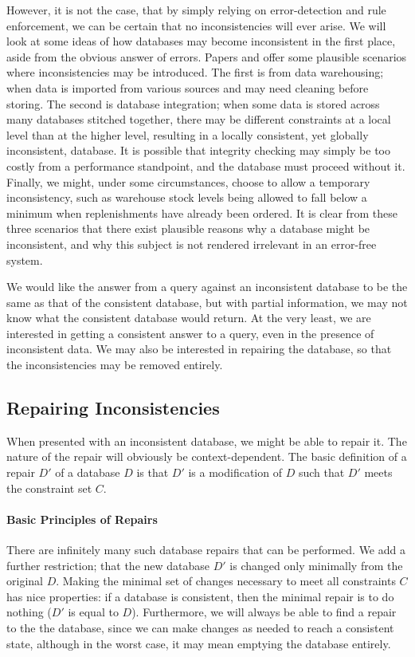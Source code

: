 \documentclass[a4paper]{report}
\begin{document}
However, it is not the case, that by simply relying on error-detection and rule enforcement, we can be certain that no inconsistencies will ever arise. We will look at some ideas of how databases may become inconsistent in the first place, aside from the obvious answer of errors. Papers \cite{CQI} and \cite{CQ} offer some plausible scenarios where inconsistencies may be introduced. The first is from data warehousing; when data is imported from various sources and may need cleaning before storing. The second is database integration; when some data is stored across many databases stitched together, there may be different constraints at a local level than at the higher level, resulting in a locally consistent, yet globally inconsistent, database. It is possible that integrity checking may simply be too costly from a performance standpoint, and the database must proceed without it. Finally, we might, under some circumstances, choose to allow a temporary inconsistency, such as warehouse stock levels being allowed to fall below a minimum when replenishments have already been ordered. It is clear from these three scenarios that there exist plausible reasons why a database might be inconsistent, and why this subject is not rendered irrelevant in an error-free system.

We would like the answer from a query against an inconsistent database to be the same as that of the consistent database, but with partial information, we may not know what the consistent database would return. At the very least, we are interested in getting a consistent answer to a query, even in the presence of inconsistent data. We may also be interested in repairing the database, so that the inconsistencies may be removed entirely.

\subsection*{Repairing Inconsistencies}
When presented with an inconsistent database, we might be able to repair it. The nature of the repair will obviously be context-dependent. The basic definition of a repair $D'$ of a database $D$ is that $D'$ is a modification of $D$ such that $D'$ meets the constraint set $C$.

\paragraph{Basic Principles of Repairs}
There are infinitely many such database repairs that can be performed. We add a further restriction; that the new database $D'$ is changed only minimally from the original $D$. Making the minimal set of changes necessary to meet all constraints $C$ has nice properties: if a database is consistent, then the minimal repair is to do nothing ($D'$ is equal to $D$). Furthermore, we will always be able to find a repair to the the database, since we can make changes as needed to reach a consistent state, although in the worst case, it may mean emptying the database entirely. \cite{CQI}
\end{document}

